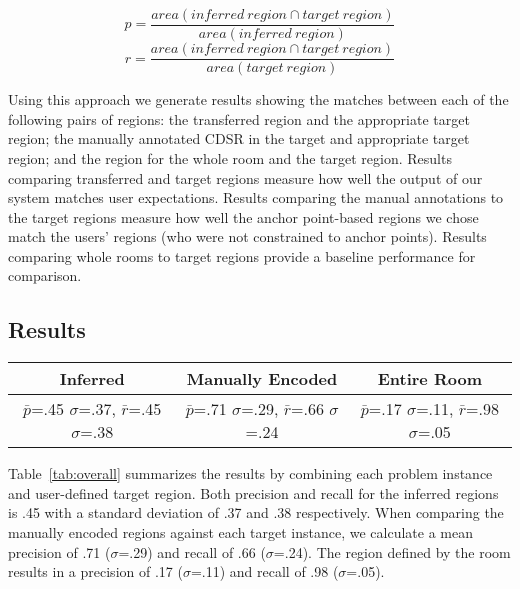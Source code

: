 \begin{equation}
	p=\frac{area(inferred\ region \cap target\ region)}{area(inferred\ region)}
\end{equation}
\begin{equation}
	r=\frac{area(inferred\ region \cap target\ region)}{area(target\ region)}
\end{equation}

Using this approach we generate results showing the matches between each of the following pairs of regions: the transferred region and the appropriate target region; the manually annotated CDSR in the target and appropriate target region; and the region for the whole room and the target region. 
 Results comparing transferred and target regions measure how well the output of our system matches user expectations. Results comparing the manual annotations to the target regions measure how well the anchor point-based regions we chose match the users' regions (who were not constrained to anchor points). Results comparing whole rooms to target regions provide a baseline performance for comparison. 


\subsection{Results}
\begin{table*}
\small
\begin{tabular}{|c|c|c|}
\hline
Inferred & Manually Encoded & Entire Room \\
\hline
$\bar{p}$=.45 $\sigma$=.37, $\bar{r}$=.45 $\sigma$=.38 & $\bar{p}$=.71 $\sigma$=.29, $\bar{r}$=.66 $\sigma$=.24  & $\bar{p}$=.17 $\sigma$=.11, $\bar{r}$=.98 $\sigma$=.05  \\
\hline
\end{tabular}
\caption{Overall Performance}
  \label{tab:overall}	

\end{table*}


Table~\ref{tab:overall} summarizes the results by combining each problem instance and user-defined target region. Both precision and recall for the inferred regions is .45 with a standard deviation of .37 and .38 respectively. When comparing the manually encoded regions against each target instance, we calculate a mean precision of .71 ($\sigma$=.29) and recall of .66 ($\sigma$=.24). The region defined by the room results in a precision of .17 ($\sigma$=.11) and recall of .98 ($\sigma$=.05).

